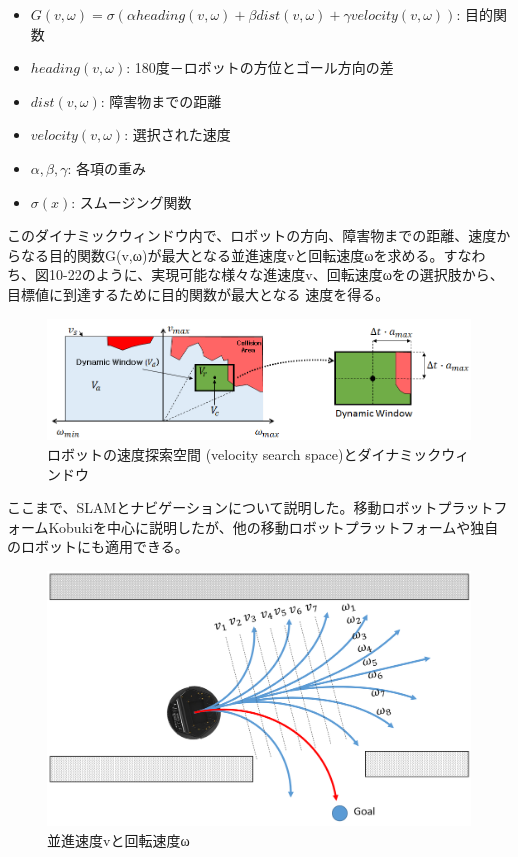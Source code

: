 \begin{itemize}
\item  $G(v,\omega) = \sigma(\alpha heading(v,\omega) + \beta dist(v,\omega) + \gamma velocity(v,\omega))$: 目的関数
\item $heading(v,\omega)$: 180度－ロボットの方位とゴール方向の差
\item $dist(v,\omega)$: 障害物までの距離
\item $velocity(v,\omega)$: 選択された速度
\item $\alpha, \beta, \gamma$: 各項の重み
\item $\sigma(x)$: スムージング関数
\end{itemize}

このダイナミックウィンドウ内で、ロボットの方向、障害物までの距離、速度からなる目的関数G(v,ω)が最大となる並進速度vと回転速度ωを求める。すなわち、図10-22のように、実現可能な様々な進速度v、回転速度ωをの選択肢から、目標値に到達するために目的関数が最大となる  速度を得る。

\begin{figure}[ht]
  \centering
  \includegraphics[width=\columnwidth]{pictures/chapter10/pic_10_21.png}
  \caption{ロボットの速度探索空間 (velocity search space)とダイナミックウィンドウ}
\end{figure}

ここまで、SLAMとナビゲーションについて説明した。移動ロボットプラットフォームKobukiを中心に説明したが、他の移動ロボットプラットフォームや独自のロボットにも適用できる。

\begin{figure}[ht]
  \centering
  \includegraphics[width=\columnwidth]{pictures/chapter10/pic_10_22.png}
  \caption{並進速度vと回転速度ω}
\end{figure}

